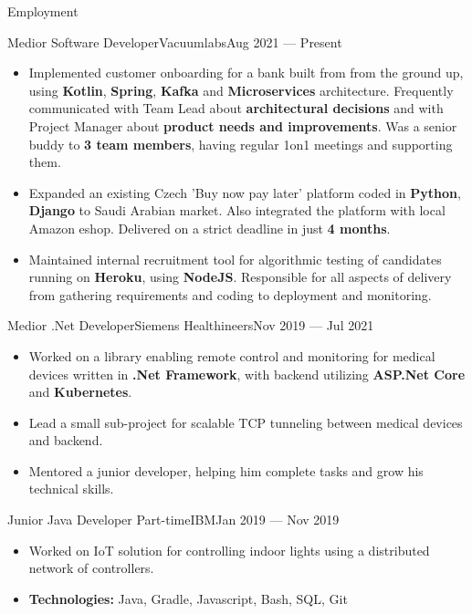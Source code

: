 \documentclass[]{style}
\begin{document}
	\makeheader

	\begin{cvsection}{Employment}
	
    	\begin{cvsubsection}{Medior Software Developer}{Vacuumlabs}{Aug 2021 — Present}
    	    \begin{itemize}
			\item Implemented customer onboarding for a bank built from from the ground up, using \textbf{Kotlin}, \textbf{Spring}, \textbf{Kafka} and \textbf{Microservices} architecture. Frequently communicated with Team Lead about \textbf{architectural decisions} and with Project Manager about \textbf{product needs and improvements}. Was a senior buddy to \textbf{3 team members}, having regular 1on1 meetings and supporting them.
            \item Expanded an existing Czech 'Buy now pay later' platform coded in \textbf{Python}, \textbf{Django} to Saudi Arabian market. Also integrated the platform with local Amazon eshop. Delivered on a strict deadline in just \textbf{4 months}.
            \item Maintained internal recruitment tool for algorithmic testing of candidates running on \textbf{Heroku}, using \textbf{NodeJS}. Responsible for all aspects of delivery from gathering requirements and coding to deployment and monitoring.
            \end{itemize}
		\end{cvsubsection}
		
    	\begin{cvsubsection}{Medior .Net Developer}{Siemens Healthineers}{Nov 2019 — Jul 2021}
			\begin{itemize}
			    \item Worked on a library enabling remote control and monitoring for medical devices written in \textbf{.Net Framework}, with backend utilizing \textbf{ASP.Net Core} and \textbf{Kubernetes}.
			    \item Lead a small sub-project for scalable TCP tunneling between medical devices and backend.
			    \item Mentored a junior developer, helping him complete tasks and grow his technical skills.
			\end{itemize}
		\end{cvsubsection}
		
    	\begin{cvsubsection}{Junior Java Developer Part-time}{IBM}{Jan 2019 — Nov 2019}
			\begin{itemize}
    			\item Worked on IoT solution for controlling indoor lights using a distributed network of controllers.
    			\item \textbf{Technologies:} Java, Gradle, Javascript, Bash, SQL, Git
			\end{itemize}
		\end{cvsubsection}
		

\end{cvsection}
\end{document}
